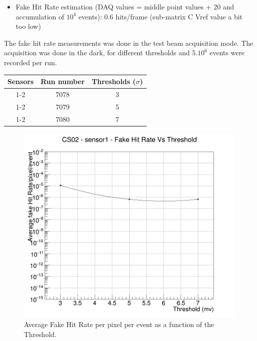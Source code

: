 \documentclass[a4papper, 10pt]{article}
\begin{document}
\begin{itemize}
        \item Fake Hit Rate estimation (DAQ values = middle point values + 20 and accumulation of $10^4$ events): 0.6 hits/frame (sub-matrix C Vref value a bit too low)
        
               
        \end{itemize}

  The fake hit rate measurements was done in the test beam acquisition mode. The acquisition was done in the dark, for different thresholds and $5.10^6$ events were recorded per run.

  \begin{center}
    \begin{tabular}{|c|c|c|}
      \hline %
   \rowcolor{light-gray}  Sensors  &  Run number  &  Thresholds  ($\sigma$) \tabularnewline
      \hline %
      1-2   &   7078   &    3 \tabularnewline
      \hline %
      1-2   &   7079   &    5 \tabularnewline
      \hline %
      1-2   &   7080   &    7 \tabularnewline
      \hline %
    \end{tabular}
  \end{center}
        \begin{figure}[!h]
            \centering
            \includegraphics[width = 12cm]{Output_CS02_FHR/Fake_results_CS02_sensor1.png}
            \caption{Average Fake Hit Rate per pixel per event as a function of the Threshold.}
        \end{figure}
\end{document}
